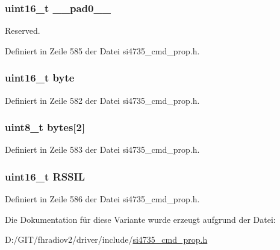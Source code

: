 \subsubsection[{\+\_\+\+\_\+pad0\+\_\+\+\_\+}]{\setlength{\rightskip}{0pt plus 5cm}uint16\+\_\+t \+\_\+\+\_\+pad0\+\_\+\+\_\+}\label{unionfm__rsq__rssi__lo__thres_a77132c2c26a75f5b8751b235cda23828}


Reserved. 



Definiert in Zeile 585 der Datei si4735\+\_\+cmd\+\_\+prop.\+h.

\hypertarget{unionfm__rsq__rssi__lo__thres_ab0549c1b5ea980a02e7eab77e21fea49}{}
\subsubsection[{byte}]{\setlength{\rightskip}{0pt plus 5cm}uint16\+\_\+t byte}\label{unionfm__rsq__rssi__lo__thres_ab0549c1b5ea980a02e7eab77e21fea49}


Definiert in Zeile 582 der Datei si4735\+\_\+cmd\+\_\+prop.\+h.

\hypertarget{unionfm__rsq__rssi__lo__thres_a46e4c05d20a047ec169f60d3167e912e}{}
\subsubsection[{bytes}]{\setlength{\rightskip}{0pt plus 5cm}uint8\+\_\+t bytes\mbox{[}2\mbox{]}}\label{unionfm__rsq__rssi__lo__thres_a46e4c05d20a047ec169f60d3167e912e}


Definiert in Zeile 583 der Datei si4735\+\_\+cmd\+\_\+prop.\+h.

\hypertarget{unionfm__rsq__rssi__lo__thres_a3486b6704157a7903fdf5db75c248898}{}
\subsubsection[{R\+S\+S\+I\+L}]{\setlength{\rightskip}{0pt plus 5cm}uint16\+\_\+t R\+S\+S\+I\+L}\label{unionfm__rsq__rssi__lo__thres_a3486b6704157a7903fdf5db75c248898}


Definiert in Zeile 586 der Datei si4735\+\_\+cmd\+\_\+prop.\+h.



Die Dokumentation für diese Variante wurde erzeugt aufgrund der Datei\+:\begin{DoxyCompactItemize}
\item 
D\+:/\+G\+I\+T/fhradiov2/driver/include/\hyperlink{si4735__cmd__prop_8h}{si4735\+\_\+cmd\+\_\+prop.\+h}\end{DoxyCompactItemize}
